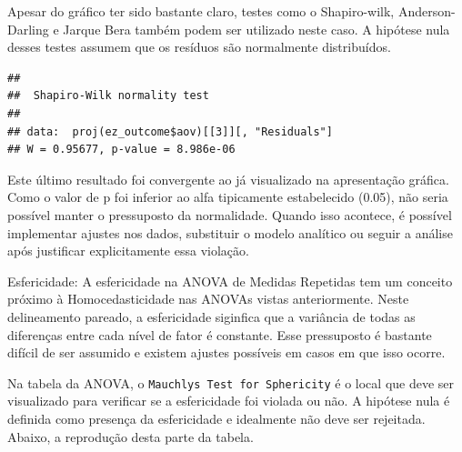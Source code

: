 \documentclass[
]{book}
\newenvironment{Shaded}{\begin{snugshade}}{\end{snugshade}}
\newcommand{\DataTypeTok}[1]{\textcolor[rgb]{0.13,0.29,0.53}{#1}}
\newcommand{\DecValTok}[1]{\textcolor[rgb]{0.00,0.00,0.81}{#1}}
\newcommand{\KeywordTok}[1]{\textcolor[rgb]{0.13,0.29,0.53}{\textbf{#1}}}
\newcommand{\NormalTok}[1]{#1}
\newcommand{\OperatorTok}[1]{\textcolor[rgb]{0.81,0.36,0.00}{\textbf{#1}}}
\newcommand{\StringTok}[1]{\textcolor[rgb]{0.31,0.60,0.02}{#1}}
\begin{document}
Apesar do gráfico ter sido bastante claro, testes como o Shapiro-wilk,
Anderson-Darling e Jarque Bera também podem ser utilizado neste caso. A
hipótese nula desses testes assumem que os resíduos são normalmente
distribuídos.

\begin{Shaded}
\end{Shaded}

\begin{verbatim}
## 
##  Shapiro-Wilk normality test
## 
## data:  proj(ez_outcome$aov)[[3]][, "Residuals"]
## W = 0.95677, p-value = 8.986e-06
\end{verbatim}

Este último resultado foi convergente ao já visualizado na apresentação
gráfica. Como o valor de p foi inferior ao alfa tipicamente estabelecido
(0.05), não seria possível manter o pressuposto da normalidade. Quando
isso acontece, é possível implementar ajustes nos dados, substituir o
modelo analítico ou seguir a análise após justificar explicitamente essa
violação.

Esfericidade: A esfericidade na ANOVA de Medidas Repetidas tem um
conceito próximo à Homocedasticidade nas ANOVAs vistas anteriormente.
Neste delineamento pareado, a esfericidade siginfica que a variância de
todas as diferenças entre cada nível de fator é constante. Esse
pressuposto é bastante difícil de ser assumido e existem ajustes
possíveis em casos em que isso ocorre.

Na tabela da ANOVA, o
\texttt{Mauchly\textquotesingle{}s\ Test\ for\ Sphericity} é o local que
deve ser visualizado para verificar se a esfericidade foi violada ou
não. A hipótese nula é definida como presença da esfericidade e
idealmente não deve ser rejeitada. Abaixo, a reprodução desta parte da
tabela.

\begin{Shaded}
\end{Shaded}
\end{document}
